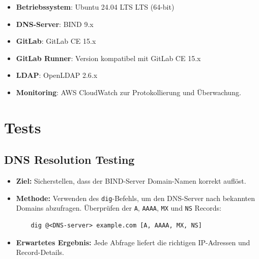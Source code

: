 \documentclass[a4paper,12pt]{article}
\begin{document}
\begin{itemize}
	\item \textbf{Betriebssystem}: Ubuntu 24.04 LTS LTS (64-bit)
	\item \textbf{DNS-Server}: BIND 9.x
	\item \textbf{GitLab}: GitLab CE 15.x
	\item \textbf{GitLab Runner}: Version kompatibel mit GitLab CE 15.x
	\item \textbf{LDAP}: OpenLDAP 2.6.x
	\item \textbf{Monitoring}: AWS CloudWatch zur Protokollierung und Überwachung.
\end{itemize}

\newpage

\section{Tests}
\subsection*{DNS Resolution Testing}
\begin{itemize}[leftmargin=1.5cm]
	\item \textbf{Ziel:} Sicherstellen, dass der BIND-Server Domain-Namen korrekt auflöst.
	\item \textbf{Methode:} Verwenden des \texttt{dig}-Befehls, um den DNS-Server nach bekannten Domains abzufragen. Überprüfen der \texttt{A}, \texttt{AAAA}, \texttt{MX} und \texttt{NS} Records:
	      \begin{verbatim}
    dig @<DNS-server> example.com [A, AAAA, MX, NS]
    \end{verbatim}
	\item \textbf{Erwartetes Ergebnis:} Jede Abfrage liefert die richtigen IP-Adressen und Record-Details.
\end{itemize}
\end{document}
